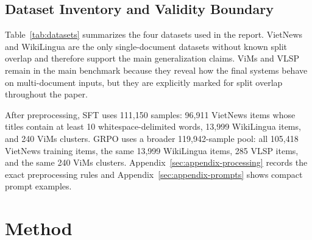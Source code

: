 \documentclass[11pt]{article}
\begin{document}
\subsection{Dataset Inventory and Validity Boundary}
Table~\ref{tab:datasets} summarizes the four datasets used in the report.
VietNews and WikiLingua are the only single-document datasets without known split overlap and therefore support the main generalization claims.
ViMs and VLSP remain in the main benchmark because they reveal how the final systems behave on multi-document inputs, but they are explicitly marked for split overlap throughout the paper.

\begin{table}[t]
\centering
\caption{Datasets used in the report. VietNews and WikiLingua provide the strongest single-document evidence. ViMs and VLSP remain visible in the benchmark tables but have split overlap with project training or validation data}
\label{tab:datasets}
\small
{}
\end{table}

After preprocessing, SFT uses 111,150 samples: 96,911 VietNews items whose titles contain at least 10 whitespace-delimited words, 13,999 WikiLingua items, and 240 ViMs clusters.
GRPO uses a broader 119,942-sample pool: all 105,418 VietNews training items, the same 13,999 WikiLingua items, 285 VLSP items, and the same 240 ViMs clusters.
Appendix~\ref{sec:appendix-processing} records the exact preprocessing rules and Appendix~\ref{sec:appendix-prompts} shows compact prompt examples.

\section{Method}
\end{document}
